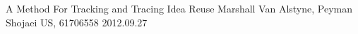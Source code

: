 

\begin{cventries}

  \cvpatententry
    {A Method For Tracking and Tracing Idea Reuse} %
    {Marshall Van Alstyne, Peyman Shojaei} %
    {US, 61706558} %
    {2012.09.27} %
    {}

\end{cventries}
